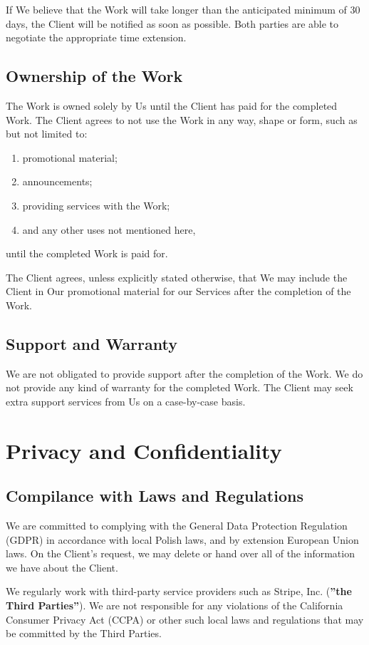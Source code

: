 \documentclass{article}
\begin{document}
If We believe that the Work will take longer than the anticipated minimum of 30 days, the Client will be notified as soon as possible. Both parties are able to negotiate the appropriate time extension.

\subsection{Ownership of the Work}
The Work is owned solely by Us until the Client has paid for the completed Work. The Client agrees to not use the Work in any way, shape or form, such as but not limited to:
\begin{enumerate}
    \item promotional material;
    \item announcements;
    \item providing services with the Work;
    \item and any other uses not mentioned here,
\end{enumerate}
until the completed Work is paid for.

The Client agrees, unless explicitly stated otherwise, that We may include the Client in Our promotional material for our Services after the completion of the Work.

\subsection{Support and Warranty}
We are not obligated to provide support after the completion of the Work. We do not provide any kind of warranty for the completed Work. The Client may seek extra support services from Us on a case-by-case basis.

\section{Privacy and Confidentiality}
\subsection{Compilance with Laws and Regulations}
We are committed to complying with the General Data Protection Regulation (GDPR) in accordance with local Polish laws, and by extension European Union laws. On the Client's request, we may delete or hand over all of the information we have about the Client.

We regularly work with third-party service providers such as Stripe, Inc. (\textbf{''the Third Parties''}). We are not responsible for any violations of the California Consumer Privacy Act (CCPA) or other such local laws and regulations that may be committed by the Third Parties.
\end{document}
